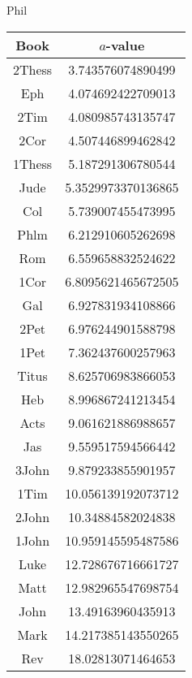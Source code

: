 \documentclass[12pt,letterpaper]{article}
\begin{document}
Phil
\begin{longtable}{|c|c|}
\hline
 Book & $a$-value \\ \hline
2Thess & 3.743576074890499 \\ \hline
 Eph & 4.074692422709013 \\ \hline
 2Tim & 4.080985743135747 \\ \hline
 2Cor & 4.507446899462842 \\ \hline
 1Thess & 5.187291306780544 \\ \hline
 Jude & 5.3529973370136865 \\ \hline
 Col & 5.739007455473995 \\ \hline
 Phlm & 6.212910605262698 \\ \hline
 Rom & 6.559658832524622 \\ \hline
 1Cor & 6.8095621465672505 \\ \hline
 Gal & 6.927831934108866 \\ \hline
 2Pet & 6.976244901588798 \\ \hline
 1Pet & 7.362437600257963 \\ \hline
 Titus & 8.625706983866053 \\ \hline
 Heb & 8.996867241213454 \\ \hline
 Acts & 9.061621886988657 \\ \hline
 Jas & 9.559517594566442 \\ \hline
 3John & 9.879233855901957 \\ \hline
 1Tim & 10.056139192073712 \\ \hline
 2John & 10.34884582024838 \\ \hline
 1John & 10.959145595487586 \\ \hline
 Luke & 12.728676716661727 \\ \hline
 Matt & 12.982965547698754 \\ \hline
 John & 13.49163960435913 \\ \hline
 Mark & 14.217385143550265 \\ \hline
 Rev & 18.02813071464653 \\ \hline 
\end{longtable}
\end{document}
